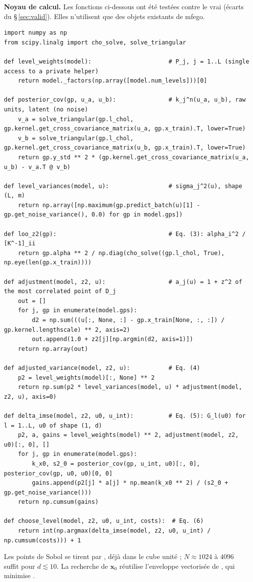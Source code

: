 \documentclass[10pt,a4paper]{article}
\theoremstyle{plain}
\newcommand{\vx}{\bm{x}}
\begin{document}
\textbf{Noyau de calcul.} Les fonctions ci-dessous ont été testées contre le vrai  (écarts
du §\,\ref{sec:valid}). Elles n'utilisent que des objets existants de mfego.
\begin{lstlisting}
import numpy as np
from scipy.linalg import cho_solve, solve_triangular

def level_weights(model):                      # P_j, j = 1..L (single access to a private helper)
    return model._factors(np.array([model.num_levels]))[0]

def posterior_cov(gp, u_a, u_b):               # k_j^n(u_a, u_b), raw units, latent (no noise)
    v_a = solve_triangular(gp.l_chol, gp.kernel.get_cross_covariance_matrix(u_a, gp.x_train).T, lower=True)
    v_b = solve_triangular(gp.l_chol, gp.kernel.get_cross_covariance_matrix(u_b, gp.x_train).T, lower=True)
    return gp.y_std ** 2 * (gp.kernel.get_cross_covariance_matrix(u_a, u_b) - v_a.T @ v_b)

def level_variances(model, u):                 # sigma_j^2(u), shape (L, m)
    return np.array([np.maximum(gp.predict_batch(u)[1] - gp.get_noise_variance(), 0.0) for gp in model.gps])

def loo_z2(gp):                                # Eq. (3): alpha_i^2 / [K^-1]_ii
    return gp.alpha ** 2 / np.diag(cho_solve((gp.l_chol, True), np.eye(len(gp.x_train))))

def adjustment(model, z2, u):                  # a_j(u) = 1 + z^2 of the most correlated point of D_j
    out = []
    for j, gp in enumerate(model.gps):
        d2 = np.sum(((u[:, None, :] - gp.x_train[None, :, :]) / gp.kernel.lengthscale) ** 2, axis=2)
        out.append(1.0 + z2[j][np.argmin(d2, axis=1)])
    return np.array(out)

def adjusted_variance(model, z2, u):           # Eq. (4)
    p2 = level_weights(model)[:, None] ** 2
    return np.sum(p2 * level_variances(model, u) * adjustment(model, z2, u), axis=0)

def delta_imse(model, z2, u0, u_int):          # Eq. (5): G_l(u0) for l = 1..L, u0 of shape (1, d)
    p2, a, gains = level_weights(model) ** 2, adjustment(model, z2, u0)[:, 0], []
    for j, gp in enumerate(model.gps):
        k_x0, s2_0 = posterior_cov(gp, u_int, u0)[:, 0], posterior_cov(gp, u0, u0)[0, 0]
        gains.append(p2[j] * a[j] * np.mean(k_x0 ** 2) / (s2_0 + gp.get_noise_variance()))
    return np.cumsum(gains)

def choose_level(model, z2, u0, u_int, costs):  # Eq. (6)
    return int(np.argmax(delta_imse(model, z2, u0, u_int) / np.cumsum(costs))) + 1
\end{lstlisting}
Les points de Sobol se tirent par , déjà dans le
cube unité ; $N\approx 1024$ à $4096$ suffit pour $d\lesssim10$. La recherche de $\vx_0$ réutilise
l'enveloppe vectorisée de , qui minimise
.
\end{document}
